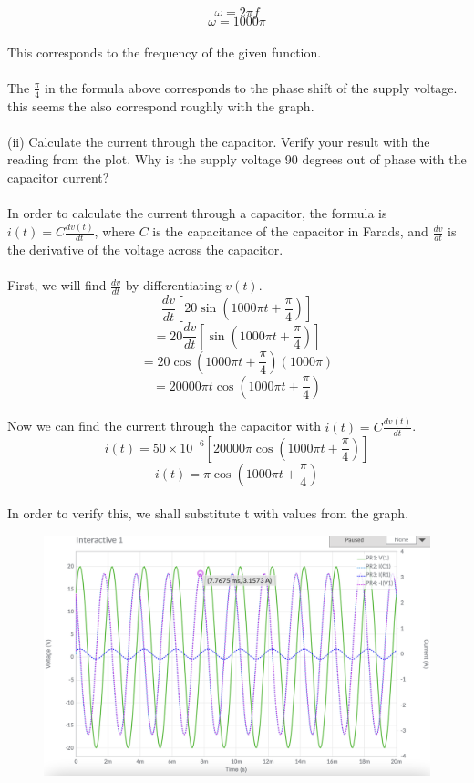 \documentclass[12pt]{article}
\begin{document}
\[\omega = 2 \pi f\]
\[\omega = 1000 \pi\]\\
This corresponds to the frequency of the given function.\\
\\
The \(\frac{\pi}{4}\) in the formula above corresponds to the phase shift of the supply voltage. this seems the also correspond roughly with the graph.\\
\\
(ii) Calculate the current through the capacitor. Verify your result with the reading from the plot. Why is the supply voltage 90 degrees out of phase with the capacitor current?\\
\\
In order to calculate the current through a capacitor, the formula is \(i(t) = C \frac{dv(t)}{dt}\), where \(C\) is the capacitance of the capacitor in Farads, and \(\frac{dv}{dt}\) is the derivative of the voltage across the capacitor.\\
\\
First, we will find \(\frac{dv}{dt}\) by differentiating \(v(t)\).\\
\[\frac{dv}{dt}[20 \sin (1000\pi t + \frac{\pi}{4})]\]
\[= 20\frac{dv}{dt}[\sin(1000\pi t + \frac{\pi}{4})]\]
\[= 20\cos (1000\pi t + \frac{\pi}{4})(1000\pi)\]
\[= 20000\pi t \cos (1000\pi t + \frac{\pi}{4})\]\\
Now we can find the current through the capacitor with \(i(t) = C \frac{dv(t)}{dt}\).\\
\[i(t) = 50 \times 10^{-6}[20000\pi \cos (1000\pi t + \frac{\pi}{4})]\]
\[i(t) = \pi \cos (1000\pi t + \frac{\pi}{4} )\]\\
\newpage
In order to verify this, we shall substitute t with values from the graph.\\
\begin{figure}[!h] 
	\begin{centering}
		\includegraphics[keepaspectratio = true, width = 6in]{q1(ii).png}
	\end{centering}
\end{figure}\\
\end{document}
